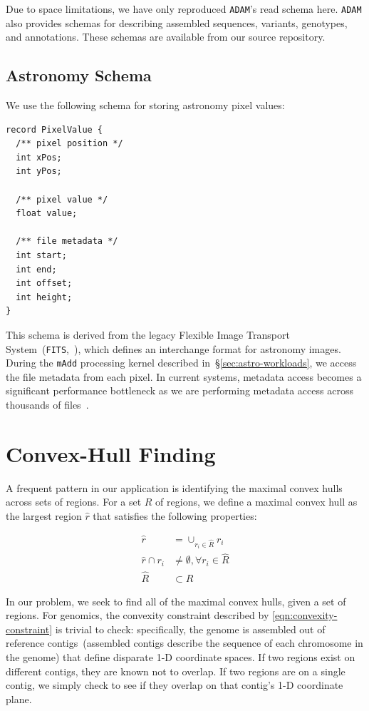 \documentclass{acm_proc_article-sp}
\begin{document}
Due to space limitations, we have only reproduced \texttt{ADAM}'s read schema here. \texttt{ADAM} also provides
schemas for describing assembled sequences, variants, genotypes, and annotations. These schemas are
available from our source repository.

\subsection{Astronomy Schema}
\label{sec:astronomy-schema}

We use the following schema for storing astronomy pixel values:

\begin{lstlisting}
record PixelValue {
  /** pixel position */
  int xPos;
  int yPos;
  
  /** pixel value */
  float value;
  
  /** file metadata */
  int start;
  int end;
  int offset;
  int height;
}
\end{lstlisting}

This schema is derived from the legacy Flexible Image Transport System~(\texttt{FITS},~\cite{wells81}), which
defines an interchange format for astronomy images. During the \texttt{mAdd} processing kernel
described in~\S\ref{sec:astro-workloads}, we access the file metadata from each pixel. In current systems,
metadata access becomes a significant performance bottleneck as we are performing metadata access
across thousands of files~\cite{zhang13}.

\section{Convex-Hull Finding}
\label{sec:convex-hull}

A frequent pattern in our application is identifying the maximal convex hulls across sets of regions. For
a set $R$ of regions, we define a maximal convex hull as the largest region $\hat{r}$ that satisfies the
following properties:

\begin{align}
\label{eqn:convexity-constraint}
\hat{r} &= \cup_{r_i \in \hat{R}} r_i \\
\hat{r} \cap r_i &\ne \emptyset, \forall r_i \in \hat{R} \\
\hat{R} &\subset R
\end{align}

In our problem, we seek to find all of the maximal convex hulls, given a set of regions. For genomics, the
convexity constraint described by \eqref{eqn:convexity-constraint} is trivial to check: specifically, the
genome is assembled out of reference contigs~(assembled contigs describe the sequence of each
chromosome in the genome) that define disparate 1-D coordinate spaces. If two regions exist on different contigs,
they are known not to overlap. If two regions are on a single contig, we simply check to see if they overlap
on that contig's 1-D coordinate plane.
\end{document}
